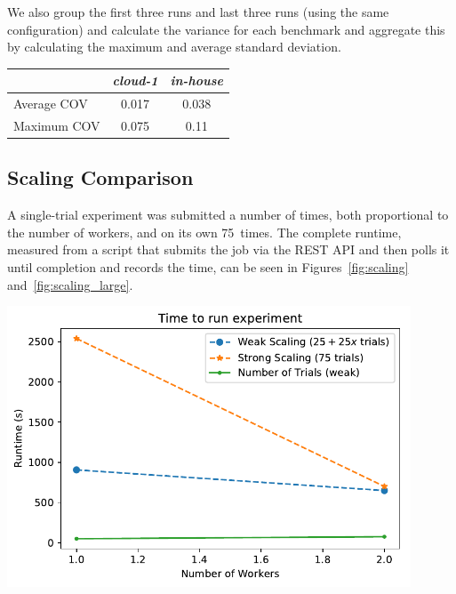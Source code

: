 \documentclass[a4paper]{IEEEtran}
\begin{document}
We also group the first three runs and last three runs (using the same configuration) and calculate the variance for each benchmark and aggregate this by calculating the maximum and average standard deviation.

\begin{Figure}
  \centering
  \begin{tabular}{|l|c|c|}
    \hline
    & \emph{cloud-1} & \emph{in-house} \\
  \hline
  Average COV & 0.017 & 0.038 \\
  \hline
  Maximum COV  & 0.075 & 0.11 \\
  \hline
\end{tabular}
\label{tbl:one}
\end{Figure}


\subsection{Scaling Comparison}

A single-trial experiment was submitted a number of times, both proportional to
the number of workers, and on its own 75~times. The complete runtime, measured
from a script that submits the job via the REST API and then polls it until
completion and records the time, can be seen in Figures~\ref{fig:scaling} and~\ref{fig:scaling_large}.
\begin{Figure}
  \centering \includegraphics[width=0.9\textwidth]{scaling_graph}
  \label{fig:scaling}
\end{Figure}
\end{document}
